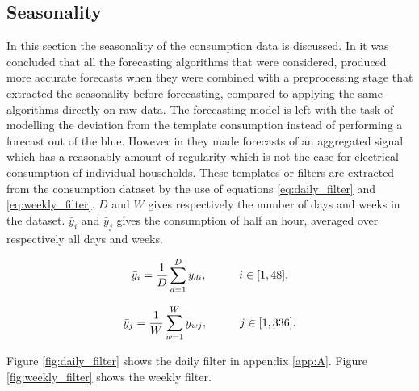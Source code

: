  


\subsection{Seasonality}
In this section the seasonality of the consumption data is discussed. In \cite{Hoverstad2015}it was concluded that all the forecasting algorithms that were considered, produced more accurate forecasts when they were combined with a preprocessing stage that extracted the seasonality before forecasting, compared to applying the same algorithms directly on raw data. The forecasting model is left with the task of modelling the deviation from the template consumption instead of performing a forecast out of the blue. However in \cite{Hoverstad2015} they made forecasts of an aggregated signal which has a reasonably amount of regularity which is not the case for electrical consumption of individual households. These templates or filters are extracted from the consumption dataset by the use of equations \ref{eq:daily_filter} and \ref{eq:weekly_filter}. $ D $ and $ W $ gives respectively the number of days and weeks in the dataset. $\bar{y}_i$ and $\bar{y}_j$ gives the consumption of half an hour, averaged over respectively all days and weeks. 

\begin{equation}\label{eq:daily_filter}
	\bar{y}_i = \frac{1}{D} \sum_{d=1}^D y_{di}, \hspace{10mm} i \in [1,48],
\end{equation} 

\begin{equation}\label{eq:weekly_filter}
	\bar{y}_j = \frac{1}{W} \sum_{w=1}^W y_{wj}, \hspace{10mm}  j \in [1,336].
\end{equation} 



Figure \ref{fig:daily_filter} shows the daily filter in appendix \ref{app:A}. Figure \ref{fig:weekly_filter} shows the weekly filter.

